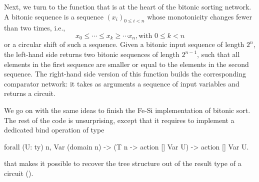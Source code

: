 \documentclass{llncs}
\begin{document}
Next, we turn to the function that is at the heart of the bitonic
sorting network.
%
A bitonic sequence is a sequence $(x_i)_{0 \le i < n}$ whose
monotonicity changes fewer than two times, i.e.,
$$ x_0 \le \cdots \le x_k \ge \cdots x_n, \text{with } 0 \le k < n $$
or a circular shift of such a sequence.
%
Given a bitonic input sequence of length $2^n$, the left-hand side
 returns two bitonic sequences of length $2^{n-1}$,
such that all elements in the first sequence are smaller or equal to
the elements in the second sequence. 
%
The right-hand side version of this function builds the corresponding
comparator network: it takes as arguments a sequence of input
variables and returns a circuit. 

We go on with the same ideas to finish the Fe-Si implementation of
bitonic sort. The rest of the code is unsurprising, except that it
requires to implement a dedicated bind operation of type
\begin{mcoq}
forall (U: ty) n,  Var (domain n) -> (T n -> action [] Var U) -> action [] Var U. 
\end{mcoq}
that makes it possible to recover the tree structure out of the
result type of a circuit ().
\end{document}
